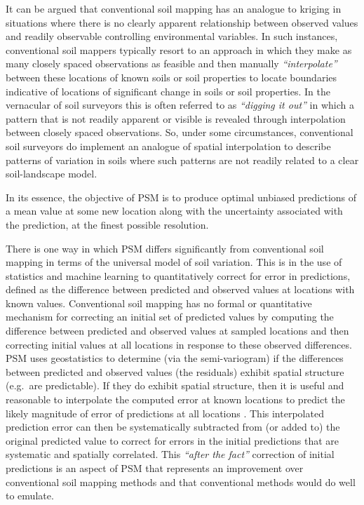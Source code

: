 \documentclass[11pt]{krantz}
\makeatletter
\newenvironment{kframe}{%
\medskip{}
\setlength{\fboxsep}{.8em}
 \def\at@end@of@kframe{}%
 \ifinner\ifhmode%
  \def\at@end@of@kframe{\end{minipage}}%
  \begin{minipage}{\columnwidth}%
 \fi\fi%
 \def\FrameCommand##1{\hskip\@totalleftmargin \hskip-\fboxsep
 \colorbox{shadecolor}{##1}\hskip-\fboxsep
     \hskip-\linewidth \hskip-\@totalleftmargin \hskip\columnwidth}%
 \MakeFramed {\advance\hsize-\width
   \@totalleftmargin\z@ \linewidth\hsize
   \@setminipage}}%
 {\par\unskip\endMakeFramed%
 \at@end@of@kframe}
\newenvironment{rmdblock}[1]
  {
  \begin{itemize}
  \renewcommand{\labelitemi}{
    \raisebox{-.7\height}[0pt][0pt]{
      {\setkeys{Gin}{width=3em,keepaspectratio}\texttt{[image: images/\#1]}}
    }
  }
  \setlength{\fboxsep}{1em}
  \begin{kframe}
  \item
  }
  {
  \end{kframe}
  \end{itemize}
  }
\newenvironment{rmdnote}
  {\begin{rmdblock}{note}}
  {\end{rmdblock}}
\theoremstyle{definition}
\theoremstyle{definition}
\theoremstyle{definition}
\theoremstyle{remark}
\makeatother
\begin{document}
It can be argued that conventional soil mapping has an analogue to
kriging in situations where there is no clearly apparent relationship
between observed values and readily observable controlling environmental
variables. In such instances, conventional soil mappers typically resort
to an approach in which they make as many closely spaced observations as
feasible and then manually \emph{``interpolate''} between these
locations of known soils or soil properties to locate boundaries
indicative of locations of significant change in soils or soil
properties. In the vernacular of soil surveyors this is often referred
to as \emph{``digging it out''} in which a pattern that is not readily
apparent or visible is revealed through interpolation between closely
spaced observations. So, under some circumstances, conventional soil
surveyors do implement an analogue of spatial interpolation to describe
patterns of variation in soils where such patterns are not readily
related to a clear soil-landscape model.

\begin{rmdnote}
In its essence, the objective of PSM is to produce optimal unbiased
predictions of a mean value at some new location along with the
uncertainty associated with the prediction, at the finest possible
resolution.
\end{rmdnote}

There is one way in which PSM differs significantly from conventional
soil mapping in terms of the universal model of soil variation. This is
in the use of statistics and machine learning to quantitatively correct
for error in predictions, defined as the difference between predicted
and observed values at locations with known values. Conventional soil
mapping has no formal or quantitative mechanism for correcting an
initial set of predicted values by computing the difference between
predicted and observed values at sampled locations and then correcting
initial values at all locations in response to these observed
differences. PSM uses geostatistics to determine (via the
semi-variogram) if the differences between predicted and observed values
(the residuals) exhibit spatial structure (e.g.~are predictable). If
they do exhibit spatial structure, then it is useful and reasonable to
interpolate the computed error at known locations to predict the likely
magnitude of error of predictions at all locations
\citep{hengl2007regression}. This interpolated prediction error can then
be systematically subtracted from (or added to) the original predicted
value to correct for errors in the initial predictions that are
systematic and spatially correlated. This \emph{``after the fact''}
correction of initial predictions is an aspect of PSM that represents an
improvement over conventional soil mapping methods and that conventional
methods would do well to emulate.
\end{document}
